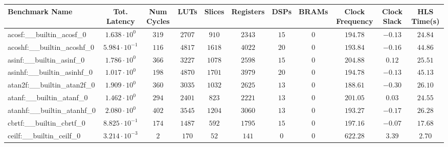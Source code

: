 \begin{tabular}{|l|c|c|c|c|c|c|c|c|c|c|}
\hline
Benchmark Name                            & Tot. Latency            & Num Cycles & LUTs      & Slices    & Registers & DSPs    & BRAMs & Clock Frequency & Clock Slack & HLS Time(s) \\
\hline
acosf:\_\_builtin\_acosf\_0               & $ 1.638 \cdot 10^{0}  $ & $ 319    $ & $ 2707  $ & $ 910   $ & $ 2343  $ & $ 15  $ & $ 0 $ & $ 194.78      $ & $ -0.13   $ & $ 24.84   $ \\
acoshf:\_\_builtin\_acoshf\_0             & $ 5.984 \cdot 10^{-1} $ & $ 116    $ & $ 4817  $ & $ 1618  $ & $ 4022  $ & $ 20  $ & $ 0 $ & $ 193.84      $ & $ -0.16   $ & $ 44.86   $ \\
asinf:\_\_builtin\_asinf\_0               & $ 1.786 \cdot 10^{0}  $ & $ 366    $ & $ 3227  $ & $ 1078  $ & $ 2598  $ & $ 15  $ & $ 0 $ & $ 204.88      $ & $ 0.12    $ & $ 25.51   $ \\
asinhf:\_\_builtin\_asinhf\_0             & $ 1.017 \cdot 10^{0}  $ & $ 198    $ & $ 4870  $ & $ 1701  $ & $ 3979  $ & $ 20  $ & $ 0 $ & $ 194.78      $ & $ -0.13   $ & $ 45.13   $ \\
atan2f:\_\_builtin\_atan2f\_0             & $ 1.909 \cdot 10^{0}  $ & $ 360    $ & $ 3035  $ & $ 1032  $ & $ 2625  $ & $ 13  $ & $ 0 $ & $ 188.61      $ & $ -0.30   $ & $ 26.10   $ \\
atanf:\_\_builtin\_atanf\_0               & $ 1.462 \cdot 10^{0}  $ & $ 294    $ & $ 2401  $ & $ 823   $ & $ 2221  $ & $ 13  $ & $ 0 $ & $ 201.05      $ & $ 0.03    $ & $ 24.55   $ \\
atanhf:\_\_builtin\_atanhf\_0             & $ 2.080 \cdot 10^{0}  $ & $ 402    $ & $ 3545  $ & $ 1204  $ & $ 3060  $ & $ 13  $ & $ 0 $ & $ 193.27      $ & $ -0.17   $ & $ 26.28   $ \\
cbrtf:\_\_builtin\_cbrtf\_0               & $ 8.825 \cdot 10^{-1} $ & $ 174    $ & $ 1487  $ & $ 592   $ & $ 1795  $ & $ 15  $ & $ 0 $ & $ 197.16      $ & $ -0.07   $ & $ 17.68   $ \\
ceilf:\_\_builtin\_ceilf\_0               & $ 3.214 \cdot 10^{-3} $ & $ 2      $ & $ 170   $ & $ 52    $ & $ 141   $ & $ 0   $ & $ 0 $ & $ 622.28      $ & $ 3.39    $ & $ 2.70    $ \\

\end{tabular}
